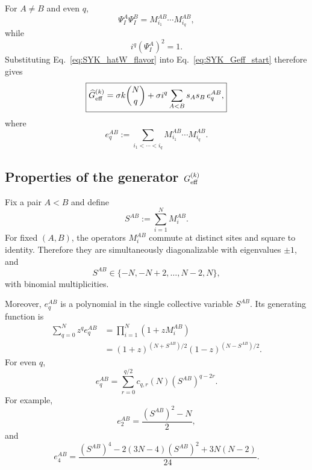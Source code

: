 \documentclass{article}
\theoremstyle{definition}
\begin{document}
For $A\neq B$ and even $q$,
\begin{equation}
    \Psi_I^A\Psi_I^B
    =
    M_{i_1}^{AB}\cdots M_{i_q}^{AB},
    \label{eq:SYK_Psi_product}
\end{equation}
while
\begin{equation}
    i^q(\Psi_I^A)^2=1.
\end{equation}
Substituting Eq.~\eqref{eq:SYK_hatW_flavor} into
Eq.~\eqref{eq:SYK_Geff_start} therefore gives
\begin{equation}
    \boxed{
    \widehat G_{\rm eff}^{(k)}
    =
    \sigma k\binom Nq
    +
    \sigma i^q
    \sum_{A<B}
    s_As_B\,e_q^{AB},
    }
    \label{eq:Geff_poly_form}
\end{equation}
where
\begin{equation}
    e_q^{AB}
    :=
    \sum_{i_1<\cdots<i_q}
    M_{i_1}^{AB}\cdots M_{i_q}^{AB}.
    \label{eq:eABq}
\end{equation}


\subsection{Properties of the generator $G_{\rm eff}^{(k)}$}

Fix a pair $A<B$ and define
\begin{equation}
    S^{AB}
    :=
    \sum_{i=1}^N M_i^{AB}.
    \label{eq:SYK_SAB}
\end{equation}
For fixed $(A,B)$, the operators $M_i^{AB}$ commute at distinct sites and
square to identity.  Therefore they are simultaneously diagonalizable
with eigenvalues $\pm1$, and
\begin{equation}
    S^{AB}
    \in
    \{-N,-N+2,\ldots,N-2,N\},
    \label{eq:SYK_S_spectrum}
\end{equation}
with binomial multiplicities.

Moreover, $e_q^{AB}$ is a polynomial in the single collective variable
$S^{AB}$.  Its generating function is
\begin{align}
    \sum_{q=0}^N z^qe_q^{AB}
    &=
    \prod_{i=1}^N
    (1+zM_i^{AB})
    \nonumber\\
    &=
    (1+z)^{(N+S^{AB})/2}
    (1-z)^{(N-S^{AB})/2}.
    \label{eq:SYK_e_generating}
\end{align}
For even $q$,
\begin{equation}
    e_q^{AB}
    =
    \sum_{r=0}^{q/2}
    c_{q,r}(N)
    (S^{AB})^{q-2r}.
    \label{eq:eABq_poly}
\end{equation}
For example,
\begin{equation}
    e_2^{AB}
    =
    \frac{
       (S^{AB})^2-N
    }{2},
\end{equation}
and
\begin{equation}
    e_4^{AB}
    =
    \frac{
       (S^{AB})^4
       -
       2(3N-4)(S^{AB})^2
       +
       3N(N-2)
    }{24}.
    \label{eq:SYK_e4}
\end{equation}
\end{document}
